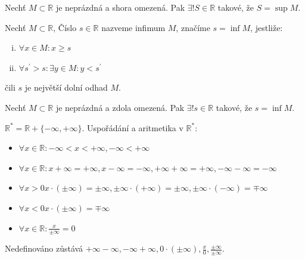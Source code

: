 \begin{axiom}[Úplnost $\mathbb R$ = Axiom suprema]
  Nechť $M \subset \mathbb R$ je neprázdná a shora omezená. Pak $\exists! S \in \mathbb R$ takové, že $S = \sup M$.
\end{axiom}

\begin{definice}
  Nechť $M \subset \mathbb R$, Číslo $s \in \mathbb R$ nazveme infimum $M$, značíme $s = \inf M$, jestliže:
  \begin{enumerate}[i.]
    \item $\forall x \in M: x \geq s$
    \item $\forall s^\prime >s: \exists y \in M: y < s^\prime$
  \end{enumerate}
  čili $s$ je největší dolní odhad $M$.
\end{definice}

\begin{axiom}[A4$^\prime$]
  Nechť $M \subset \mathbb R$ je neprázdná a zdola omezená. Pak $\exists! s \in \mathbb R$ takové, že $s = \inf M$.
\end{axiom}

\begin{definice}
  $\mathbb R^* = \mathbb R + \{- \infty, + \infty\}$. Uspořádání a aritmetika v $\mathbb R^*$:
  \begin{itemize}
    \item $\forall x \in \mathbb R: -\infty < x < +\infty, -\infty < +\infty$
    \item $\forall x \in \mathbb R: x+\infty=+\infty, x-\infty=-\infty, +\infty+\infty=+\infty, -\infty-\infty=-\infty$
    \item $\forall x > 0 x \cdot (\pm \infty) = \pm \infty, \pm \infty \cdot (+\infty) = \pm \infty, \pm \infty \cdot (-\infty) = \mp \infty$
    \item $\forall x < 0 x \cdot (\pm \infty) = \mp \infty$
    \item $\forall x \in \mathbb R: \frac{x}{\pm \infty} = 0$
  \end{itemize}
  Nedefinováno zůstává $+ \infty -\infty, -\infty+\infty, 0 \cdot( \pm \infty), \frac{x}{0}, \frac{\pm \infty}{\pm \infty}$.
\end{definice}

